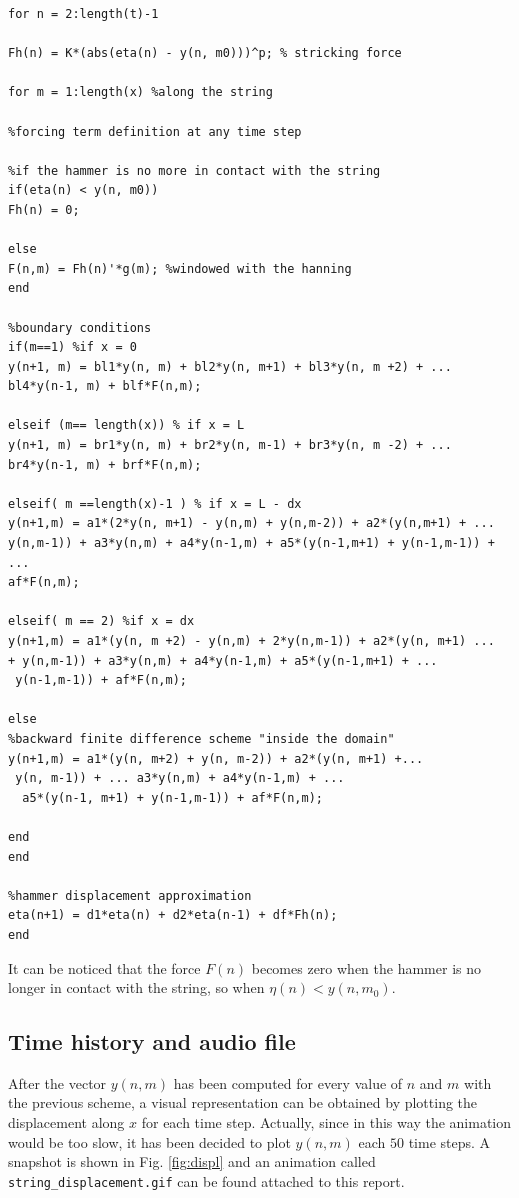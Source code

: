 \documentclass[a4paper]{article}
\begin{document}
 \begin{verbatim}
for n = 2:length(t)-1

Fh(n) = K*(abs(eta(n) - y(n, m0)))^p; % stricking force

for m = 1:length(x) %along the string

%forcing term definition at any time step

%if the hammer is no more in contact with the string
if(eta(n) < y(n, m0)) 
Fh(n) = 0;

else
F(n,m) = Fh(n)'*g(m); %windowed with the hanning
end

%boundary conditions
if(m==1) %if x = 0
y(n+1, m) = bl1*y(n, m) + bl2*y(n, m+1) + bl3*y(n, m +2) + ...
bl4*y(n-1, m) + blf*F(n,m);

elseif (m== length(x)) % if x = L
y(n+1, m) = br1*y(n, m) + br2*y(n, m-1) + br3*y(n, m -2) + ...
br4*y(n-1, m) + brf*F(n,m);

elseif( m ==length(x)-1 ) % if x = L - dx
y(n+1,m) = a1*(2*y(n, m+1) - y(n,m) + y(n,m-2)) + a2*(y(n,m+1) + ...
y(n,m-1)) + a3*y(n,m) + a4*y(n-1,m) + a5*(y(n-1,m+1) + y(n-1,m-1)) + ...
af*F(n,m);

elseif( m == 2) %if x = dx
y(n+1,m) = a1*(y(n, m +2) - y(n,m) + 2*y(n,m-1)) + a2*(y(n, m+1) ...
+ y(n,m-1)) + a3*y(n,m) + a4*y(n-1,m) + a5*(y(n-1,m+1) + ...
 y(n-1,m-1)) + af*F(n,m);

else 
%backward finite difference scheme "inside the domain"
y(n+1,m) = a1*(y(n, m+2) + y(n, m-2)) + a2*(y(n, m+1) +...
 y(n, m-1)) + ... a3*y(n,m) + a4*y(n-1,m) + ...
  a5*(y(n-1, m+1) + y(n-1,m-1)) + af*F(n,m);

end  
end

%hammer displacement approximation
eta(n+1) = d1*eta(n) + d2*eta(n-1) + df*Fh(n);   
end
 \end{verbatim}
 
 It can be noticed that the force $F(n)$ becomes zero when the hammer is no longer in contact with the string, so when $\eta(n) < y(n,m_0)$.
 
 \subsection{Time history and audio file}
 After the vector $y(n,m)$ has been computed for every value of $n$ and $m$ with the previous scheme, a visual representation can be obtained by plotting the displacement along $x$ for each time step. Actually, since in this way the animation would be too slow, it has been decided to plot $y(n,m)$ each $50$ time steps. A snapshot is shown in Fig. \ref{fig:displ} and an animation called \verb|string_displacement.gif| can be found attached to this report. 
\end{document}
